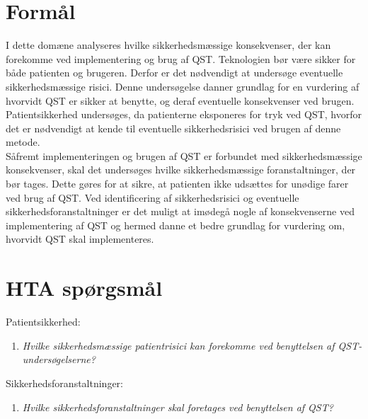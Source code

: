 \section{Formål} 
I dette domæne analyseres hvilke sikkerhedsmæssige konsekvenser, der kan forekomme ved implementering og brug af QST. Teknologien bør være sikker for både patienten og brugeren. Derfor er det nødvendigt at undersøge eventuelle sikkerhedsmæssige risici. Denne undersøgelse danner grundlag for en vurdering af hvorvidt QST er sikker at benytte, og deraf eventuelle konsekvenser ved brugen. \\
Patientsikkerhed undersøges, da patienterne eksponeres for tryk ved QST, hvorfor det er nødvendigt at kende til eventuelle sikkerhedsrisici ved brugen af denne metode. \\
Såfremt implementeringen og brugen af QST er forbundet med sikkerhedsmæssige konsekvenser, skal det undersøges hvilke sikkerhedsmæssige foranstaltninger, der bør tages. Dette gøres for at sikre, at patienten ikke udsættes for unødige farer ved brug af QST. Ved identificering af sikkerhedsrisici og eventuelle sikkerhedsforanstaltninger er det muligt at imødegå nogle af konsekvenserne ved implementering af QST og hermed danne et bedre grundlag for vurdering om, hvorvidt QST skal implementeres.

\section{HTA spørgsmål}
Patientsikkerhed:
\begin{enumerate}
\item \textit{Hvilke sikkerhedsmæssige patientrisici kan forekomme ved benyttelsen af QST-undersøgelserne?} %
\end{enumerate}
Sikkerhedsforanstaltninger:
\begin{enumerate}[resume]
\item \textit{Hvilke sikkerhedsforanstaltninger skal foretages ved benyttelsen af QST?}  %
\end{enumerate}


